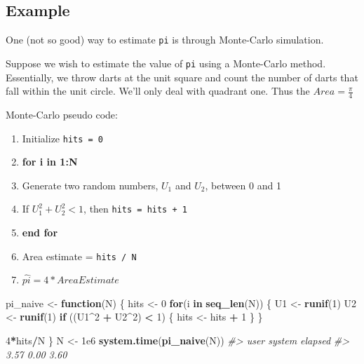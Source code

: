 \documentclass[]{book}
\newenvironment{Shaded}{\begin{snugshade}}{\end{snugshade}}
\newcommand{\KeywordTok}[1]{\textcolor[rgb]{0.13,0.29,0.53}{\textbf{#1}}}
\newcommand{\DecValTok}[1]{\textcolor[rgb]{0.00,0.00,0.81}{#1}}
\newcommand{\FloatTok}[1]{\textcolor[rgb]{0.00,0.00,0.81}{#1}}
\newcommand{\StringTok}[1]{\textcolor[rgb]{0.31,0.60,0.02}{#1}}
\newcommand{\CommentTok}[1]{\textcolor[rgb]{0.56,0.35,0.01}{\textit{#1}}}
\newcommand{\ControlFlowTok}[1]{\textcolor[rgb]{0.13,0.29,0.53}{\textbf{#1}}}
\newcommand{\OperatorTok}[1]{\textcolor[rgb]{0.81,0.36,0.00}{\textbf{#1}}}
\newcommand{\NormalTok}[1]{#1}
\providecommand{\tightlist}{%
  \setlength{\itemsep}{0pt}\setlength{\parskip}{0pt}}
\theoremstyle{definition}
\theoremstyle{definition}
\theoremstyle{definition}
\theoremstyle{remark}
\begin{document}
\subsection{Example}\label{example}

One (not so good) way to estimate \texttt{pi} is through Monte-Carlo
simulation.

Suppose we wish to estimate the value of \texttt{pi} using a Monte-Carlo
method. Essentially, we throw darts at the unit square and count the
number of darts that fall within the unit circle. We'll only deal with
quadrant one. Thus the \(Area = \frac{\pi}{4}\)

Monte-Carlo pseudo code:

\begin{enumerate}
\def\labelenumi{\arabic{enumi}.}
\tightlist
\item
  Initialize \texttt{hits\ =\ 0}
\item
  \textbf{for i in 1:N}
\item
  Generate two random numbers, \(U_1\) and \(U_2\), between 0 and 1
\item
  If \(U_1^2 + U_2^2 < 1\), then \texttt{hits\ =\ hits\ +\ 1}
\item
  \textbf{end for}
\item
  Area estimate = \texttt{hits\ /\ N}
\item
  \(\hat{pi} = 4 * Area Estimate\)
\end{enumerate}

\begin{Shaded}
\begin{Highlighting}[]
\NormalTok{pi_naive <-}\StringTok{ }\ControlFlowTok{function}\NormalTok{(N) \{}
\NormalTok{  hits <-}\StringTok{ }\DecValTok{0}
  \ControlFlowTok{for}\NormalTok{(i }\ControlFlowTok{in} \KeywordTok{seq_len}\NormalTok{(N)) \{}
\NormalTok{    U1 <-}\StringTok{ }\KeywordTok{runif}\NormalTok{(}\DecValTok{1}\NormalTok{)}
\NormalTok{    U2 <-}\StringTok{ }\KeywordTok{runif}\NormalTok{(}\DecValTok{1}\NormalTok{)}
    \ControlFlowTok{if}\NormalTok{ ((U1}\OperatorTok{^}\DecValTok{2} \OperatorTok{+}\StringTok{ }\NormalTok{U2}\OperatorTok{^}\DecValTok{2}\NormalTok{) }\OperatorTok{<}\StringTok{ }\DecValTok{1}\NormalTok{) \{}
\NormalTok{      hits <-}\StringTok{ }\NormalTok{hits }\OperatorTok{+}\StringTok{ }\DecValTok{1}
\NormalTok{    \}}
\NormalTok{  \}}
  
  \DecValTok{4}\OperatorTok{*}\NormalTok{hits}\OperatorTok{/}\NormalTok{N}
\NormalTok{\}}
\NormalTok{N <-}\StringTok{ }\FloatTok{1e6}
\KeywordTok{system.time}\NormalTok{(}\KeywordTok{pi_naive}\NormalTok{(N))}
\CommentTok{#>    user  system elapsed }
\CommentTok{#>    3.57    0.00    3.60}
\end{Highlighting}
\end{Shaded}
\end{document}
